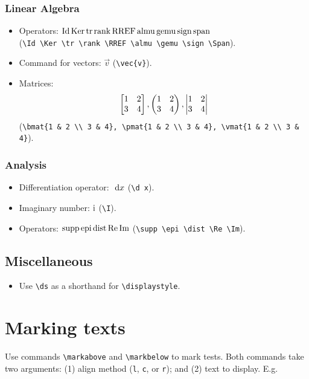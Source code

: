 \documentclass[10pt,letterpaper]{amsart}
\begin{document}
\subsubsection*{Linear Algebra}
\begin{itemize} 
  \item Operators: \(\operatorname{Id} \operatorname{Ker} \operatorname{tr} \operatorname{rank} \operatorname{RREF} \operatorname{almu} \operatorname{gemu} \operatorname{sign} \operatorname{span}\) \\
    (\verb|\Id \Ker \tr \rank \RREF \almu \gemu \sign \Span|). 
  \item Command for vectors: \(\vec{v}\) (\verb|\vec{v}|).
  \item Matrices: \[
    \begin{bmatrix} 1 & 2 \\ 3 & 4 \end{bmatrix}, \begin{pmatrix} 1 & 2 \\ 3 & 4 \end{pmatrix}, \begin{vmatrix} 1 & 2 \\ 3 & 4 \end{vmatrix}
  \]
  (\verb|\bmat{1 & 2 \\ 3 & 4}, \pmat{1 & 2 \\ 3 & 4}, \vmat{1 & 2 \\ 3 & 4}|). 
\end{itemize}

\subsubsection*{Analysis}
\begin{itemize} 
  \item Differentiation operator: \(\ \mathrm{d} x\) (\verb|\d x|).
  \item Imaginary number: \(\mathrm{i}\) (\verb|\I|).
  \item Operators: \(\operatorname{supp} \operatorname{epi} \operatorname{dist} \operatorname{Re} \operatorname{Im}\) (\verb|\supp \epi \dist \Re \Im|).
\end{itemize}


\subsection{Miscellaneous}
\begin{itemize}
  \item Use \verb|\ds| as a shorthand for \verb|\displaystyle|. 
\end{itemize}


\section{Marking texts}
Use commands \verb|\markabove| and \verb|\markbelow| to mark tests. Both commands take two arguments: (1) align method (\verb|l|, \verb|c|, or \verb|r|); and (2) text to display. E.g. 
\end{document}
